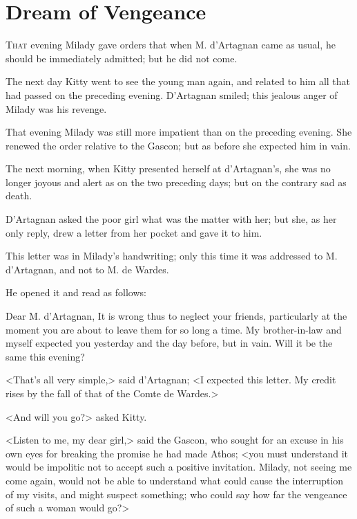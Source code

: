 
\chapter{Dream of Vengeance}

\lettrine[]{T}{hat} evening Milady gave orders that when M. d'Artagnan came as usual, he should be immediately admitted; but he did not come. 

\zz
The next day Kitty went to see the young man again, and related to him all that had passed on the preceding evening. D'Artagnan smiled; this jealous anger of Milady was his revenge. 

That evening Milady was still more impatient than on the preceding evening. She renewed the order relative to the Gascon; but as before she expected him in vain. 

The next morning, when Kitty presented herself at d'Artagnan's, she was no longer joyous and alert as on the two preceding days; but on the contrary sad as death. 

D'Artagnan asked the poor girl what was the matter with her; but she, as her only reply, drew a letter from her pocket and gave it to him. 

This letter was in Milady's handwriting; only this time it was addressed to M. d'Artagnan, and not to M. de Wardes. 

He opened it and read as follows: 

\begin{mail}{}{Dear M. d'Artagnan,}
It is wrong thus to neglect your friends, particularly at the moment you are about to leave them for so long a time. My brother-in-law and myself expected you yesterday and the day before, but in vain. Will it be the same this evening? 

\end{mail}

<That's all very simple,> said d'Artagnan; <I expected this letter. My credit rises by the fall of that of the Comte de Wardes.> 

<And will you go?> asked Kitty. 

<Listen to me, my dear girl,> said the Gascon, who sought for an excuse in his own eyes for breaking the promise he had made Athos; <you must understand it would be impolitic not to accept such a positive invitation. Milady, not seeing me come again, would not be able to understand what could cause the interruption of my visits, and might suspect something; who could say how far the vengeance of such a woman would go?> 

